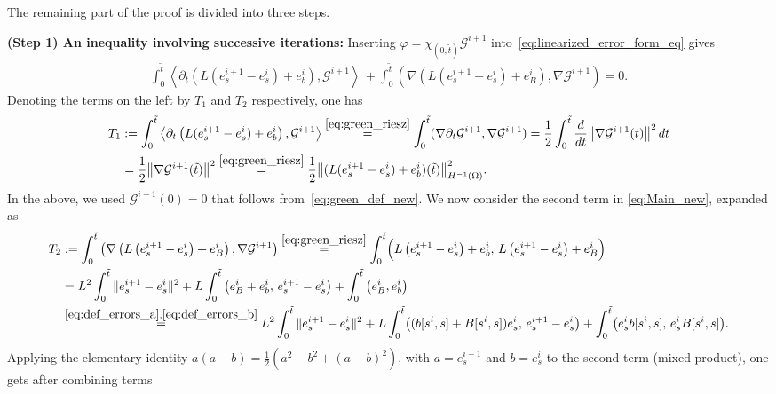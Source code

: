 \documentclass[review,11pt]{article}
\numberwithin{equation}{section}
\begin{document}
The remaining part of the proof is divided into three steps.

\textbf{(Step 1) An inequality involving successive iterations:} Inserting $\varphi =\chi_{(0,\tilde{t})} \mathcal{G}^{i+1}$ into~\eqref{eq:linearized_error_form_eq}  gives
\begin{align}\label{eq:Main_new}
\int_0^{\tilde{t}} \left\langle \partial_t \left( L(e_s^{i+1} - e_s^i) + e_b^i \right), \mathcal{G}^{i+1} \right\rangle \,  + \int_0^{\tilde{t}} \left( \nabla \left( L\left(e_s^{i+1} - e_s^i\right) + e_B^i \right), \nabla \mathcal{G}^{i+1} \right) = 0.
\end{align}
Denoting the terms on the left by $T_1$ and $T_2$ respectively, one has
\begin{align}
 T_1 &:= \int_0^{\tilde{t}} \left\langle \partial_t \left( L(e_s^{i+1} - e_s^i) + e_b^i \right), \mathcal{G}^{i+1} \right\rangle \overset{\eqref{eq:green_riesz}}{=} 
\int_0^{\tilde{t}} (\nabla \partial_t \mathcal{G}^{i+1}, \nabla \mathcal{G}^{i+1})= \frac{1}{2} \int_0^{\tilde{t}} \frac{d}{dt} \big\|\nabla \mathcal{G}^{i+1}(t)\big\|^2\,dt \nonumber\\
&= \frac{1}{2}\big\|\nabla \mathcal{G}^{i+1}({\tilde{t}})\big\|^2\overset{\eqref{eq:green_riesz}}{=}\frac{1}{2} \big\|(L(e_s^{i+1}-e_s^i)+e_b^i)({\tilde{t}})\big\|_{H^{-1}(\Omega)}^2.\label{T_1_energy_new}
\end{align}
In the above, we used  $\mathcal{G}^{i+1}(0)=0$ that follows from~\eqref{eq:green_def_new}.
We now consider the second term in \eqref{eq:Main_new}, expanded as
\begin{align*}
T_2 & := \int_0^{\tilde{t}} \left( \nabla \left( L\left(e_s^{i+1} 
- e_s^i\right) + e_B^i \right), \nabla \mathcal{G}^{i+1} \right) \overset{\eqref{eq:green_riesz}}{=} 
\int_0^{\tilde{t}} \Bigl( L\left(e_s^{i+1} - e_s^i\right) + e_b^i,\, 
L\left(e_s^{i+1} - e_s^i\right) + e_B^i \Bigr)\\
&= L^2 \int_0^{\tilde{t}} \| e_s^{i+1} - e_s^i \|^2
+L \int_0^{\tilde{t}} \left( e_B^i +e_b^i, \,
e_s^{i+1} - e_s^i\right) 
+ \int_0^{\tilde{t}} \left( e_B^i, e_b^i \right) \\
&\overset{\eqref{eq:def_errors_a},\eqref{eq:def_errors_b}}{=} 
L^2\int_0^{\tilde{t}} \|e_s^{i+1} - e_s^i\|^2 +L \int_0^{\tilde{t}} \bigl((b[s^i,s]+B[s^i,s])e_s^i,\,
e_s^{i+1} - e_s^i\bigr)
+\int_0^{\tilde{t}} \bigl(e_s^i b[s^i,s],\,e_s^i B[s^i,s]\bigr).
\end{align*}
Applying the elementary identity $a(a-b)=\tfrac{1}{2}(a^2-b^2+(a-b)^2)$, with $a=e_s^{i+1}$ and $b=e_s^{i}$ to the second term (mixed product), one gets after combining terms
\end{document}
